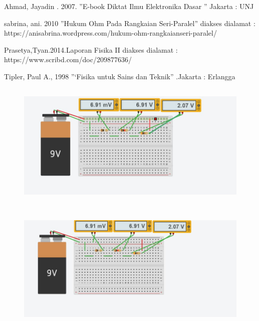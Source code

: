 \documentclass[12pt,a4paper]{article}
\begin{document}
\newpage
\begin{thebibliography}{99} %
 {Ahmad, Jayadin . 2007. ”E-book Diktat Ilmu Elektronika Dasar ” Jakarta : UNJ }

 { sabrina, ani. 2010 ”Hukum Ohm Pada Rangkaian Seri-Paralel” diakses dialamat : https://anisabrina.wordpress.com/hukum-ohm-rangkaianseri-paralel/}

 {Prasetya,Tyan.2014.Laporan Fisika II diakses dialamat : https://www.scribd.com/doc/209877636/}

 {Tipler, Paul A., 1998 ”‘Fisika untuk Sains dan Teknik” .Jakarta : Erlangga }

\end{thebibliography}

\newpage
\begin{figure}
	\begin{center}
		\includegraphics[width=12cm, height=6cm]{g1.png}
			\end{center}
				\end{figure}
\begin{figure}
	\begin{center}
		\includegraphics[width=12cm, height=6cm]{g2.png}
			\end{center}
				\end{figure}
\newpage
\end{document}
